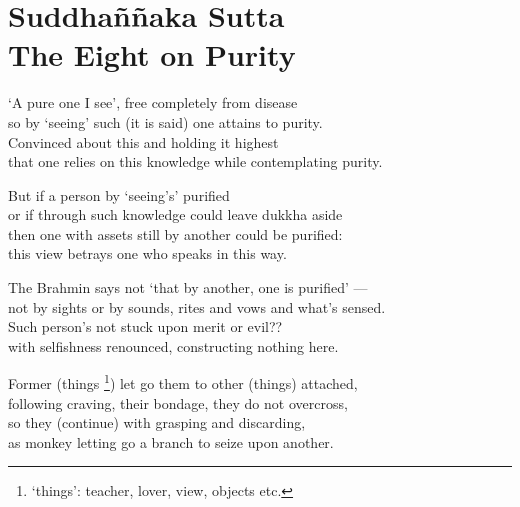 \begin{MyDescription}[(Sn. 780-787)]{}

\end{MyDescription}
   
   
 
\chapter{Suddha\~n\~naka Sutta\\ The Eight on Purity}

\begin{MyDescription}{}
`A pure one I see', free completely from disease\\
so by `seeing' such (it is said) one attains to purity.\\
Convinced about this and holding it highest\\
that one relies on this knowledge while contemplating purity.
\end{MyDescription}

\begin{MyDescription}{}
But if a person by `seeing's' purified\\
or if through such knowledge could leave dukkha aside\\
then one with assets still by another could be purified:\\
this view betrays one who speaks in this way.
\end{MyDescription}

\begin{MyDescription}{}
The Brahmin says not `that by another, one is purified' —\\
not by sights or by sounds, rites and vows and what's sensed.\\
Such person's not stuck upon merit or evil??\\
with selfishness renounced, constructing nothing here.
\end{MyDescription}

\begin{MyDescription}{}
Former (things \footnote{`things': teacher, lover, view, objects etc.}) let go them to other (things) attached,\\
following craving, their bondage, they do not overcross,\\
so they (continue) with grasping and discarding,\\
as monkey letting go a branch to seize upon another.
\end{MyDescription}

